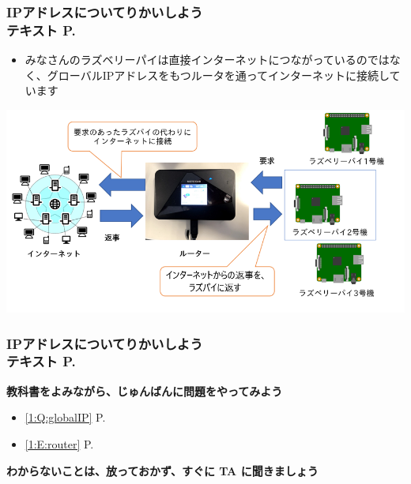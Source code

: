 \begin{frame}[fragile]
	\frametitle{\large{IPアドレスについてりかいしよう\\テキスト P.\pageref{1:P:slide_p14}}~~~}
            
    \begin{itemize}\small
                \item みなさんのラズベリーパイは直接インターネットにつながっているのではなく、グローバルIPアドレスをもつルータを通ってインターネットに接続しています
            \end{itemize}
            \vfill
            
			\begin{minipage}{\textwidth}
                {\upshape
                  \includegraphics[width=\textwidth]{text07-img/ome7-img013.png}}
            \end{minipage}
\end{frame}

\begin{frame}[fragile]
	\frametitle{\large{IPアドレスについてりかいしよう\\テキスト P.\pageref{1:P:slide_p15}}~~~}
    \large\textbf{教科書をよみながら、じゅんばんに問題をやってみよう}
				\begin{itemize}\small
					\item \ref*{1:Q:globalIP} P.\pageref{1:Q:globalIP}
					\item \ref*{1:E:router} P.\pageref{1:E:router}
				\end{itemize}
      \vfill
      \large\textbf{わからないことは、放っておかず、すぐに TA に聞きましょう}
\end{frame}


